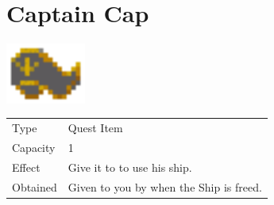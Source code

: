 \section{Captain Cap}
\label{item:captain_cap}

\includegraphics[height=2cm,keepaspectratio]{./resources/items/captaincap}

\begin{longtable}{ l p{9cm} }
	Type
	& Quest Item
\\ %
	Capacity
	& 1
\\ %
	Effect
	& Give it to \nameref{char:mac} to use his ship.
\\ %
	Obtained
	& Given to you by \nameref{char:kaeli} when the Ship is freed.
\end{longtable}

